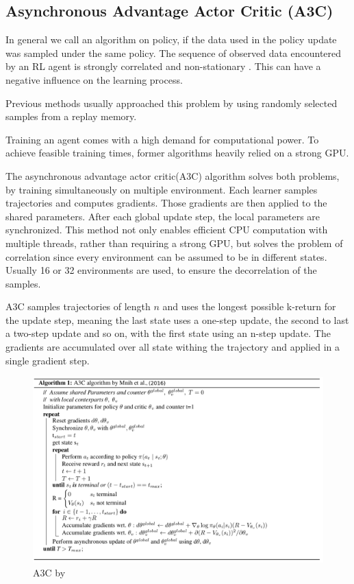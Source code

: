 \pagebreak



\subsection{Asynchronous Advantage Actor Critic (A3C)}

In general we call an algorithm on policy, if the data used in the policy update was sampled under the same policy. The sequence of observed data encountered by an RL agent is strongly correlated and non-stationary \citep{A3C}. This can have a negative influence on the learning process.

Previous methods usually approached this problem by using randomly selected samples from a replay memory. \citep{mnih2015atari}

Training an agent comes with a high demand for computational power. To achieve feasible training times, former algorithms heavily relied on a strong GPU.

The asynchronous advantage actor critic(A3C) algorithm solves both problems, by training simultaneously on multiple environment.
Each learner samples trajectories and computes gradients. Those gradients are then applied to the shared parameters. 
After each global update step, the local parameters are synchronized.
This method not only enables efficient CPU computation with multiple threads, rather than requiring a strong GPU, but solves the problem of correlation since every environment can be assumed to be in different states.
Usually 16 or 32 environments are used, to ensure the decorrelation of the samples.

A3C samples trajectories of length $n$ and uses the longest possible k-return for the update step, meaning the last state uses a one-step update, the second to last a two-step update and so on, with the first state using an n-step update.
The gradients are accumulated over all state withing the trajectory and applied in a single gradient step. 

\begin{figure} 
\includegraphics[scale=0.3]{bilder/aaac.png}
\caption{A3C by \citet{A3C}}
\end{figure}